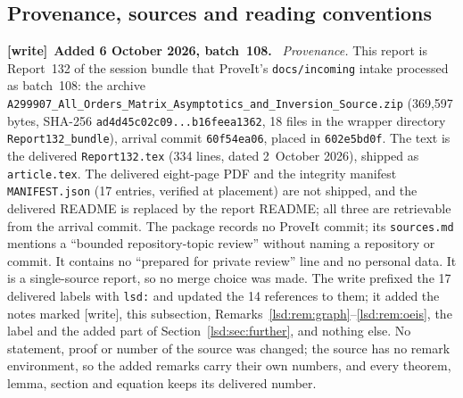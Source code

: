 \documentclass[11pt]{article}
\theoremstyle{remark}\newtheorem{remark}{Remark}
\newcommand{\file}[1]{\nolinkurl{#1}}
\newenvironment{writenote}[1][]{\par\smallskip\begingroup\small
 \noindent\textbf{[write]}\if\relax\detokenize{#1}\relax\else~\textbf{#1.}\fi\ }%
 {\par\endgroup\smallskip}
\begin{document}
\subsection{Provenance, sources and reading conventions}\label{lsd:sec:provenance}
\begin{writenote}[Added 6 October 2026, batch~108]
\emph{Provenance.} This report is Report~132 of the session bundle that
ProveIt's \file{docs/incoming} intake processed as batch~108: the archive
\file{A299907_All_Orders_Matrix_Asymptotics_and_Inversion_Source.zip}
(369{,}597 bytes, SHA-256 \file{ad4d45c02c09...b16feea1362}, 18 files in the
wrapper directory \file{Report132_bundle}), arrival commit \file{60f54ea06},
placed in \file{602e5bd0f}. The text is the delivered \file{Report132.tex}
(334 lines, dated 2~October 2026), shipped as \file{article.tex}. The
delivered eight-page PDF and the integrity manifest \file{MANIFEST.json} (17
entries, verified at placement) are not shipped, and the delivered README is
replaced by the report README; all three are retrievable from the arrival
commit. The package records no ProveIt commit; its \file{sources.md} mentions
a ``bounded repository-topic review'' without naming a repository or commit.
It contains no ``prepared for private review'' line and no personal data. It
is a single-source report, so no merge choice was made. The write prefixed the
17 delivered labels with \file{lsd:} and updated the 14 references to them;
it added the notes marked [write], this subsection,
Remarks~\ref{lsd:rem:graph}--\ref{lsd:rem:oeis}, the label and the added part
of Section~\ref{lsd:sec:further}, and nothing else. No statement, proof or
number of the source was changed; the source has no remark environment, so the
added remarks carry their own numbers, and every theorem, lemma, section and
equation keeps its delivered number.


\end{writenote}
\end{document}
